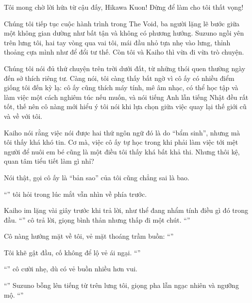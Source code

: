 \documentclass[../main.tex]{subfiles}
\begin{document}
Tôi mong chờ lời hứa từ cậu đấy, Hikawa Kuon! Đừng để làm cho tôi thất vọng!

\ct


Chúng tôi tiếp tục cuộc hành trình trong The Void, ba người lặng lẽ bước giữa một không gian dường như bất tận và không có phương hướng. Suzuno ngồi yên trên lưng tôi, hai tay vòng qua vai tôi, mái đầu nhỏ tựa nhẹ vào lưng, thỉnh thoảng cựa mình như để đổi tư thế. Còn tôi và Kaiho thì vừa đi vừa trò chuyện.

Chúng tôi nói đủ thứ chuyện trên trời dưới đất, từ những thói quen thường ngày đến sở thích riêng tư. Càng nói, tôi càng thấy bất ngờ vì cô ấy có nhiều điểm giống tôi đến kỳ lạ: cô ấy cũng thích máy tính, mê âm nhạc, có thể học tập và làm việc một cách nghiêm túc nếu muốn, và nói tiếng Anh lẫn tiếng Nhật đều rất tốt, thế nên cô nàng mới hiểu ý tôi nói khi lựa chọn giữa việc quay lại thế giới cũ và về với tôi.

Kaiho nói rằng việc nói được hai thứ ngôn ngữ đó là do ``bẩm sinh'', nhưng mà tôi thấy khá khó tin. Cơ mà, việc cô ấy tự học trong khi phải làm việc tới mệt người để nuôi em bé cũng là một điều tôi thấy khá bất khả thi. Nhưng thôi kệ, quan tâm tiểu tiết làm gì nhỉ?

Nói thật, gọi cô ấy là ``bản sao'' của tôi cũng chẳng sai là bao.

``'' tôi hỏi trong lúc mắt vẫn nhìn về phía trước.

Kaiho im lặng vài giây trước khi trả lời, như thể đang nhẩm tính điều gì đó trong đầu. ``'' cô trả lời, giọng bình thản nhưng thấp đi một chút. ``''

Cô nàng hướng mặt về tôi, vẻ mặt thoáng trầm buồn: ``''

Tôi khẽ gật đầu, cố không để lộ vẻ ái ngại. ``''

``'' cô cười nhẹ, dù có vẻ buồn nhiều hơn vui.

``'' Suzuno bỗng lên tiếng từ trên lưng tôi, giọng pha lẫn ngạc nhiên và ngưỡng mộ. ``''
\end{document}
